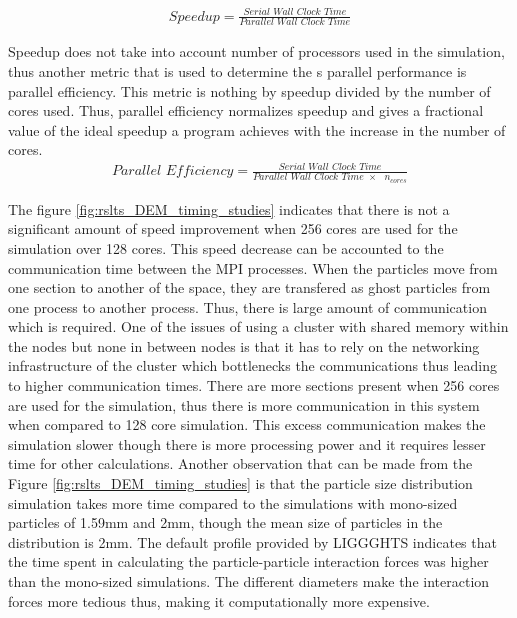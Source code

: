 \documentclass[preprint,11pt,authoryear]{elsarticle}
\begin{document}
\begin{align}
\textit{Speedup} = \frac{\textit{Serial Wall Clock Time}}{\textit{Parallel Wall Clock Time}}
\label{eqn:rslts_DEM_Speed_Up}
\end{align}

Speedup does not take into account number of processors used in the simulation, thus another metric 
that is used to determine the s parallel performance is parallel efficiency. This metric is nothing by 
speedup divided by the number of cores used. Thus, parallel efficiency normalizes speedup and gives 
a fractional value of the ideal speedup a program achieves with the increase in the number of cores.\\

\begin{align}
\textit{Parallel Efficiency} = \frac{\textit{Serial Wall Clock Time}}{\textit{Parallel Wall Clock Time $\times$ $n_{cores}$}}
\label{eqn:rslts_DEM_parallel_efficiency}
\end{align}

    
 The figure \ref{fig:rslts_DEM_timing_studies} indicates that there is not a significant amount of 
speed improvement when 256 cores are used for the simulation over 128 cores. This speed decrease 
can be accounted to the communication time between the MPI processes. When the particles move 
from one section to another of the space, they are transfered as ghost particles from one process to 
another process. Thus, there is large amount of communication which is required. One of the issues of 
using a cluster with shared memory within the nodes but none in between nodes is that it has to rely 
on the networking infrastructure of the cluster which bottlenecks the communications thus leading to 
higher communication times. There are more sections present when 256 cores are used for the 
simulation, thus there is more communication in this system when compared to 128 core simulation. 
This excess communication makes the simulation slower though there is more processing power and 
it requires lesser time for other calculations. Another observation that can be made from the Figure 
\ref{fig:rslts_DEM_timing_studies} is that the particle size distribution simulation takes more time 
compared to the simulations with mono-sized particles of 1.59mm and 2mm, though the mean size of 
particles in the distribution is 2mm. The default profile provided by LIGGGHTS indicates that the time 
spent in calculating the particle-particle interaction forces was higher than the mono-sized 
simulations. The different diameters make the interaction forces more tedious thus, making it 
computationally more expensive. 
\end{document}

